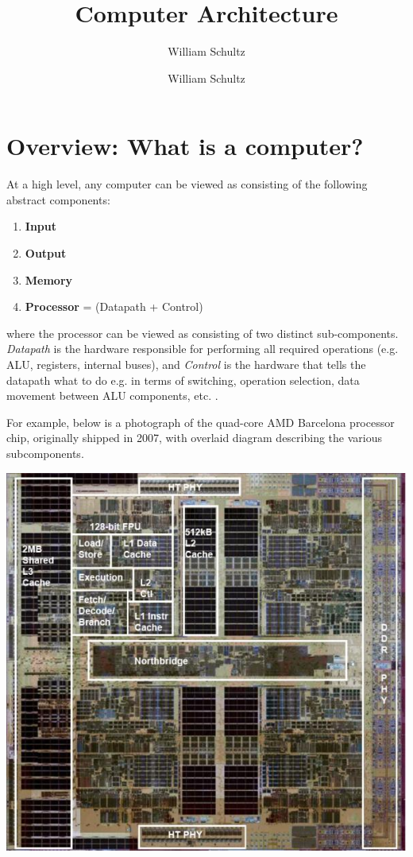 \documentclass[10pt,a4paper]{article}
\author{William Schultz}
\begin{document}
\title{Computer Architecture}
\author{William Schultz}
\maketitle

\section{Overview: What is a computer?}

At a high level, any computer can be viewed as consisting of the following abstract components:
\begin{enumerate}
    \item \textbf{Input}
    \item \textbf{Output}
    \item \textbf{Memory}
    \item \textbf{Processor} = (Datapath + Control)
\end{enumerate}
 where the processor can be viewed as consisting of two distinct sub-components. \textit{Datapath} is the hardware responsible for performing all required operations (e.g. ALU, registers, internal buses), and \textit{Control} is the hardware that tells the datapath what to do e.g. in terms of switching, operation selection, data movement between ALU components, etc. \cite{2011fourthcomporgdesign}.

 For example, below is a photograph of the quad-core AMD Barcelona processor chip, originally shipped in 2007, with overlaid diagram describing the various subcomponents.

\begin{center}
\includegraphics[scale=0.4]{images/amd_barcelona_die.png}
\end{center}
\end{document}
